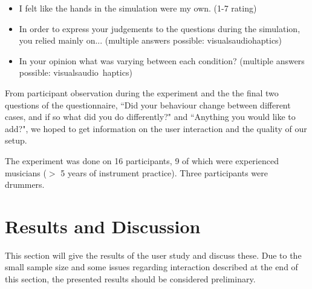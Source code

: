 \documentclass{article}
\begin{document}
\begin{itemize}
    \item I felt like the hands in the simulation were my own. (1-7 rating)
    \item In order to express your judgements to the questions during the simulation, you relied mainly on... (multiple answers possible: visuals\textbar audio\textbar haptics)
    \item In your opinion what was varying between each condition? (multiple answers possible: visuals\textbar audio\textbar\ haptics)
\end{itemize}
From participant observation during the experiment and the the final two questions of the questionnaire, ``Did your behaviour change between different cases, and if so what did you do differently?" and ``Anything you would like to add?", we hoped to get information on the user interaction and the quality of our setup.

The experiment was done on 16 participants, 9 of which were experienced musicians ($>$ 5 years of instrument practice). Three participants were drummers. 

\section{Results and Discussion}\label{sec:resDisc}
This section will give the results of the user study and discuss these. Due to the small sample size and some issues regarding interaction described at the end of this section, the presented results should be considered preliminary.
\end{document}
